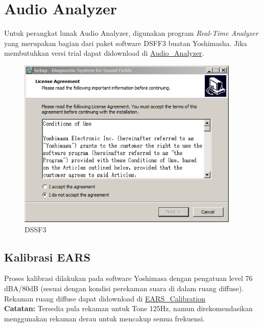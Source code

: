 \documentclass[12pt]{book}
\begin{document}
    \section{Audio Analyzer}

    Untuk perangkat lunak Audio Analyzer, digunakan program \textit{Real-Time Analyzer}
    yang merupakan bagian dari paket software DSFF3 buatan Yoshimasha.
    Jika membutuhkan versi trial dapat didownload di \href{https://drive.google.com/drive/folders/1Z4cc4C_vb7BwU_MHDFyJTTVzQO7n7AHP?usp=share_link}{Audio\_Analyzer}.

    \begin{figure}[!ht]
    	\centering
    	\includegraphics[width=300pt]{images/software/dssf3}
    	\caption{DSSF3}
    \end{figure}

    \subsection{Kalibrasi EARS}

    Proses kalibrasi dilakukan pada software Yoshimasa dengan pengatuan level 76 dBA/80dB (sesuai dengan kondisi perekaman suara di dalam ruang diffuse).
    Rekaman ruang diffuse dapat didownload di \href{https://drive.google.com/drive/folders/1FfFU9WPwoisH7j-oDqF8G0ruZmY0lxM_?usp=share_link}{EARS\_Calibration}\\

    \textbf{Catatan:} Tersedia pula rekaman untuk Tone 125Hz, namun direkomendasikan menggunakan rekaman derau untuk mencakup semua frekuensi.\\
\end{document}
